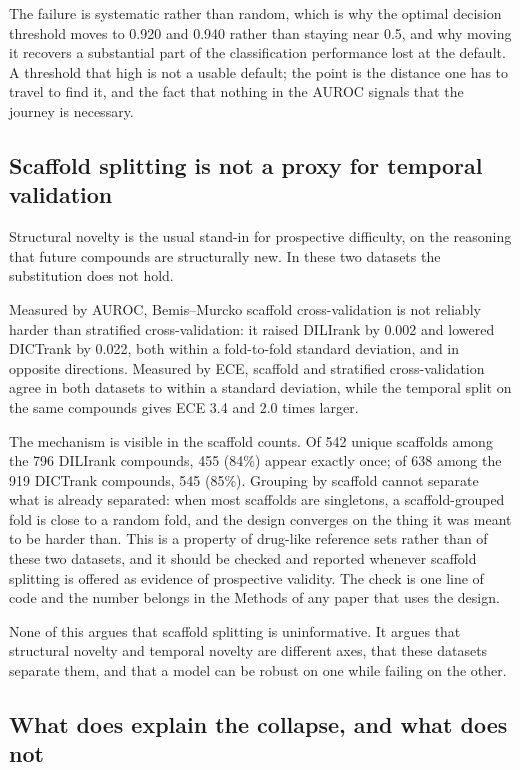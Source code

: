 The failure is systematic rather than random, which is why the optimal decision
threshold moves to 0.920 and 0.940 rather than staying near 0.5, and why moving
it recovers a substantial part of the classification performance lost at the
default. A threshold that high is not a usable default; the point is the distance
one has to travel to find it, and the fact that nothing in the AUROC signals that
the journey is necessary.

\subsection{Scaffold splitting is not a proxy for temporal validation}

Structural novelty is the usual stand-in for prospective difficulty, on the
reasoning that future compounds are structurally new. In these two datasets the
substitution does not hold.

Measured by AUROC, Bemis--Murcko scaffold cross-validation is not reliably harder
than stratified cross-validation: it raised DILIrank by 0.002 and lowered DICTrank
by 0.022, both within a fold-to-fold standard deviation, and in opposite
directions. Measured by ECE, scaffold and stratified cross-validation agree in
both datasets to within a standard deviation, while the temporal split on the same
compounds gives ECE 3.4 and 2.0 times larger.

The mechanism is visible in the scaffold counts. Of 542 unique scaffolds among the
796 DILIrank compounds, 455 (84\%) appear exactly once; of 638 among the 919
DICTrank compounds, 545 (85\%). Grouping by scaffold cannot separate what is
already separated: when most scaffolds are singletons, a scaffold-grouped fold is
close to a random fold, and the design converges on the thing it was meant to be
harder than. This is a property of drug-like reference sets rather than of these
two datasets, and it should be checked and reported whenever scaffold splitting is
offered as evidence of prospective validity. The check is one line of code and the
number belongs in the Methods of any paper that uses the design.

None of this argues that scaffold splitting is uninformative. It argues that
structural novelty and temporal novelty are different axes, that these datasets
separate them, and that a model can be robust on one while failing on the other.

\subsection{What does explain the collapse, and what does not}

